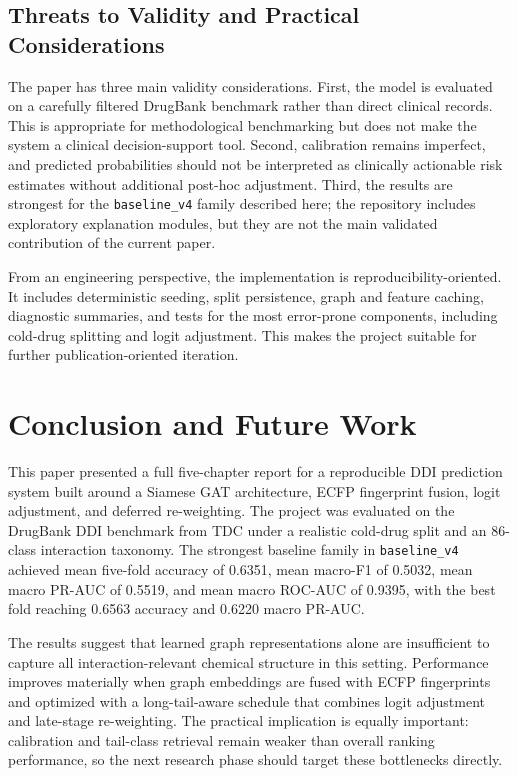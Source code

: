 \documentclass[12pt,a4paper]{report}
\begin{document}
\section{Threats to Validity and Practical Considerations}
The paper has three main validity considerations. First, the model is evaluated on a carefully filtered DrugBank benchmark rather than direct clinical records. This is appropriate for methodological benchmarking but does not make the system a clinical decision-support tool. Second, calibration remains imperfect, and predicted probabilities should not be interpreted as clinically actionable risk estimates without additional post-hoc adjustment. Third, the results are strongest for the \texttt{baseline\_v4} family described here; the repository includes exploratory explanation modules, but they are not the main validated contribution of the current paper.

From an engineering perspective, the implementation is reproducibility-oriented. It includes deterministic seeding, split persistence, graph and feature caching, diagnostic summaries, and tests for the most error-prone components, including cold-drug splitting and logit adjustment. This makes the project suitable for further publication-oriented iteration.

\chapter{Conclusion and Future Work}
This paper presented a full five-chapter report for a reproducible DDI prediction system built around a Siamese GAT architecture, ECFP fingerprint fusion, logit adjustment, and deferred re-weighting. The project was evaluated on the DrugBank DDI benchmark from TDC under a realistic cold-drug split and an 86-class interaction taxonomy. The strongest baseline family in \texttt{baseline\_v4} achieved mean five-fold accuracy of 0.6351, mean macro-F1 of 0.5032, mean macro PR-AUC of 0.5519, and mean macro ROC-AUC of 0.9395, with the best fold reaching 0.6563 accuracy and 0.6220 macro PR-AUC.

The results suggest that learned graph representations alone are insufficient to capture all interaction-relevant chemical structure in this setting. Performance improves materially when graph embeddings are fused with ECFP fingerprints and optimized with a long-tail-aware schedule that combines logit adjustment and late-stage re-weighting. The practical implication is equally important: calibration and tail-class retrieval remain weaker than overall ranking performance, so the next research phase should target these bottlenecks directly.
\end{document}
